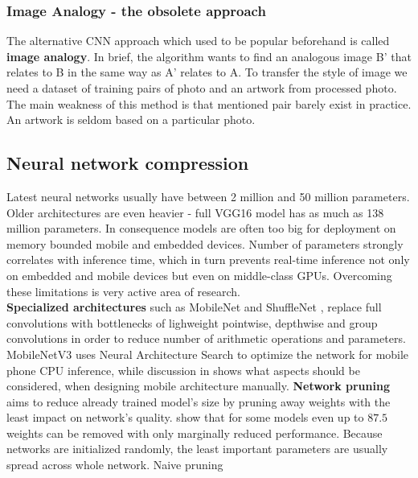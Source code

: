\documentclass[../Main.tex]{subfiles}
\begin{document}
    
    \subsubsection{Image Analogy - the obsolete approach}
    The alternative CNN approach which used to be popular beforehand is called \textbf{image analogy}. In brief, the algorithm wants to find an analogous image B' that relates to B in the same way as A' relates to A.  To transfer the style of image we need a dataset of training pairs of photo and an artwork from processed photo. The main weakness of this method is that mentioned pair barely exist in practice. An artwork is seldom based on a particular photo.


\subsection{Neural network compression}
    Latest neural networks usually have between 2 million and 50 million parameters.
    Older architectures are even heavier - full VGG16 model has as much as
    138 million parameters. In consequence models 
    are often too big for deployment on memory bounded mobile and embedded devices.
    Number of parameters strongly correlates with inference time, which in turn
    prevents real-time inference not only on embedded and mobile
    devices but even on middle-class GPUs. Overcoming these limitations 
    is very active area of research.\\
    \textbf{Specialized architectures} such as MobileNet \cite{mobilenetv1, 
    mobilenetv2, mobilenetv3} and ShuffleNet \cite{shufflenetv1,
    shufflenetv2}, replace full convolutions with bottlenecks of lighweight
    pointwise, depthwise and group convolutions in order to reduce number of 
    arithmetic operations and parameters. MobileNetV3 \cite{mobilenetv3} uses
    Neural Architecture Search to optimize the network for mobile phone CPU
    inference, while discussion in \cite{shufflenetv2} shows what aspects should
    be considered, when designing mobile architecture manually. 
    \textbf{Network pruning} aims to reduce already trained model's size by pruning away
    weights with the least impact on network's quality. \cite{zhu2017prune} show
    that for some models even up to $87.5$ weights can be removed with only 
    marginally reduced performance. 
    Because networks are initialized randomly, the least
    important parameters are usually spread across whole network. Naive pruning 
\end{document}
